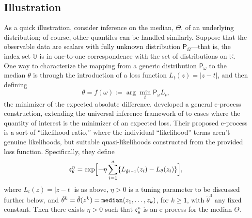\documentclass[a4paper, 12pt]{article}
\theoremstyle{plain}
\theoremstyle{definition}
\theoremstyle{remark}
\newcommand{\prob}{\mathsf{P}}
\newcommand{\RR}{\mathbb{R}}
\newcommand{\OO}{\mathbb{O}}
\newcommand{\eval}{\mathfrak{e}}
\begin{document}


\subsection{Illustration}
\label{SS:gue}

As a quick illustration, consider inference on the median, $\Theta$, of an underlying distribution; of course, other quantiles can be handled similarly.  Suppose that the observable data are scalars with fully unknown distribution $\prob_\Omega$---that is, the index set $\OO$ is in one-to-one correspondence with the set of distributions on $\RR$.  One way to characterize the mapping from a generic distribution $\prob_\omega$ to the median $\theta$ is through the introduction of a loss function $L_t(z) = |z-t|$, and then defining 
\[ \theta = f(\omega) := \arg\min_t \prob_\omega L_t, \]
the minimizer of the expected absolute difference.  \citet{dey.gue} developed a general e-process construction, extending the universal inference framework of \citet{wasserman.universal} to cases where the quantity of interest is the minimizer of an expected loss.  Their proposed e-process is a sort of ``likelihood ratio,'' where the individual ``likelihood'' terms aren't genuine likelihoods, but suitable quasi-likelihoods constructed from the provided loss function.  Specifically, they define 
\[ \eval_\theta^n = \exp\Bigl[ -\eta \sum_{i=1}^n\{ L_{\hat\theta^{i-1}}(z_i) - L_\theta(z_i)\} \Bigr], \]
where $L_t(z) = |z-t|$ is as above, $\eta > 0$ is a tuning parameter to be discussed further below, and $\hat\theta^k = \hat\theta(z^k) = \text{\tt median}(z_1,\ldots,z_k)$, for $k \geq 1$, with $\hat\theta^0$ any fixed constant.  Then there exists $\eta > 0$ such that $\eval_\theta^n$ is an e-process for the median $\Theta$.  
\end{document}
